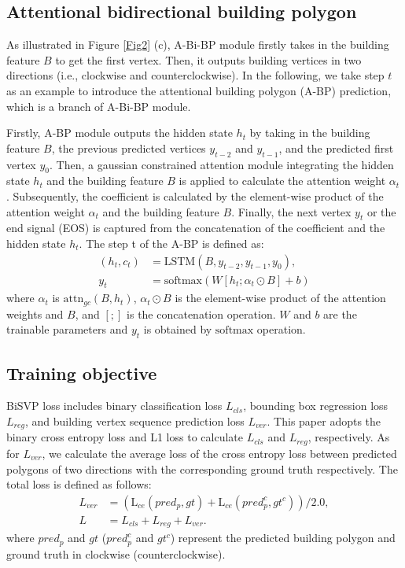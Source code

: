 \documentclass{article}
\begin{document}
\subsection{Attentional bidirectional building polygon}
As illustrated in Figure \ref{Fig2} (c), A-Bi-BP module firstly takes in the building feature $\textit{B}$ to get the first vertex. Then, it outputs building vertices in two directions (i.e., clockwise and counterclockwise). In the following, we take step $\textit{t}$ as an example to introduce the attentional building polygon (A-BP) prediction, which is a branch of A-Bi-BP module.

Firstly, A-BP module outputs the hidden state $h_t$ by taking in the building feature $\textit{B}$, the previous predicted vertices $y_{t-2}$ and $y_{t-1}$, and the predicted first vertex $y_0$. Then, a gaussian constrained attention \cite{qiao2021gaussian} module integrating the hidden state $h_t$ and the building feature $\textit{B}$ is applied to calculate the attention weight ${\alpha}_t$. Subsequently, the coefficient is calculated by the element-wise product of the attention weight ${\alpha}_t$ and the building feature $\textit{B}$. Finally, the next vertex $y_t$ or the end signal (EOS) is captured from the concatenation of the coefficient and the hidden state $h_t$. The step t of the A-BP is defined as:
\begin{equation} \label{eqn2}
  \begin{split}
  (h_t, c_t)&=\text{LSTM}(B, y_{t-2}, y_{t-1}, y_0),    \\
  y_t&=\text{softmax}(W[h_t;{{\alpha}_t}\odot{B}]+b)
  \end{split}
\end{equation}
where ${\alpha}_t$ is $\text{attn}_{gc}(B, h_t)$, ${\alpha}_t\odot{B}$ is the element-wise product of the attention weights and $B$, and $[;]$ is the concatenation operation. $W$ and $b$ are the trainable parameters and $y_t$ is obtained by $\text{softmax}$ operation.
\vspace{-10pt}
\subsection{Training objective}
BiSVP loss includes binary classification loss $L_{cls}$, bounding box regression loss $L_{reg}$, and building vertex sequence prediction loss $L_{ver}$. This paper adopts the binary cross entropy loss and L1 loss to calculate $L_{cls}$ and $L_{reg}$, respectively. As for $L_{ver}$, we calculate the average loss of the cross entropy loss between predicted polygons of two directions with the corresponding ground truth respectively. The total loss is defined as follows:
\begin{equation} \label{eqn3}
  \begin{split}
  L_{ver}&=(\text{L}_{ce}(pred_p, gt) + \text{L}_{ce}(pred_p^{c}, gt^{c})) / 2.0, \\
  L&=L_{cls} + L_{reg} + L_{ver}.
  \end{split}
\end{equation}
where $pred_p$ and $gt$ ($pred_p^{c}$ and $gt^{c}$) represent the predicted building polygon and ground truth in clockwise (counterclockwise).
\end{document}
